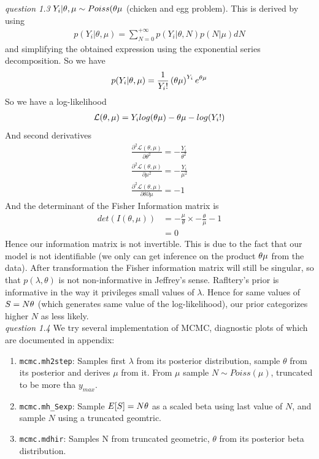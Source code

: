 \documentclass[twoside]{article}
\begin{document}
\vspace{.2 in}
\textit{question 1.3} $Y_i | \theta, \mu \sim Poiss(\theta \* \mu$ (chicken and egg problem). This is derived by using
\begin{align*}
p(Y_i | \theta, \mu) = \sum_{N=0}^{+\infty} p(Y_i| \theta, N) p(N | \mu) dN
\end{align*}
and simplifying the obtained expression using the exponential series decomposition. So we have
\begin{align*}
p(Y_i | \theta, \mu) = \frac{1}{Y_i !} \left(\theta \* \mu \right)^{Y_i} \* e^{\theta \*\mu} 
\end{align*}
So we have a log-likelihood
\begin{align*}
\mathcal{L}(\theta, \mu) = Y_i \* log(\theta \* \mu) - \theta \* \mu -log(Y_i!)
\end{align*}
And second derivatives
\begin{align*}
\frac{\partial^2 \mathcal{L}(\theta, \mu)}{\partial \theta^2} = - \frac{Y_i}{\theta^2}\\
\frac{\partial^2 \mathcal{L}(\theta, \mu)}{\partial \mu^2} = - \frac{Y_i}{\mu^2}\\
\frac{\partial^2 \mathcal{L}(\theta, \mu)}{\partial \theta \partial \mu} = - 1
\end{align*}
And the determinant of the Fisher Information matrix is 
\begin{align*}
det(I(\theta, \mu)) & = -\frac{\mu}{\theta} \times - \frac{\theta}{\mu} - 1\\
& = 0
\end{align*}
Hence our information matrix is not invertible. This is due to the fact that our model is not identifiable (we only can get inference on the product $\theta \* \mu$ from the data). After transformation the Fisher information matrix will still be singular, so that $p(\lambda, \theta)$ is not non-informative in Jeffrey's sense. Rafltery's prior is informative in the way it privileges small values of $\lambda$. Hence for same values of $S = N \* \theta$ (which generates same value of the log-likelihood), our prior categorizes higher $N$ as less likely.\\


\vspace{.2 in}
\textit{question 1.4} We try several implementation of MCMC, diagnostic plots of which are documented in appendix:
\begin{enumerate}
\item \texttt{mcmc.mh2step}: Samples first $\lambda$ from its posterior distribution, sample $\theta$ from its posterior and derives $\mu$ from it. From $\mu$ sample $N \sim Poiss(\mu)$, truncated to be more tha $y_{max}$.
\item \texttt{mcmc.mh\_Sexp}: Sample $E[S] = N \* \theta$ as a scaled beta using last value of $N$, and sample $N$ using a truncated geomtric.
\item \texttt{mcmc.mdhir}: Samples N from truncated geometric, $\theta$ from its posterior beta distribution.
\end{enumerate}
\end{document}
